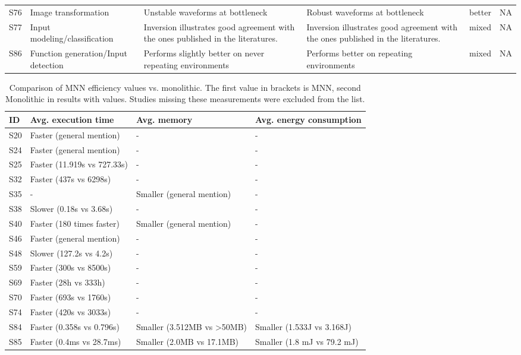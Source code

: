 \documentclass{article}
\begin{document}
\begin{table*}[]
\begin{tabularx}{\textwidth}{p{.2cm} p{4.75cm}  X X p{1.5cm} p{1.5cm} }
S76 	&	 Image transformation 			&	 Unstable waveforms at bottleneck 	&	 Robust waveforms at bottleneck 	&	better	&	 NA 	\\
S77 	&	 Input modeling/classification 			&	 Inversion illustrates good agreement with the ones published in the literatures. 	&	 Inversion illustrates good agreement with the ones published in the literatures. 	&	mixed	&	 NA 	\\
S86 	&	 Function generation/Input detection 			&	 Performs slightly better on never repeating environments 	&	 Performs better on repeating environments 	&	 mixed 	&	 NA 	\\

\hline
\end{tabularx}
\end{table*}


\begin{table*}[h]
\centering
\caption{Comparison of MNN efficiency values vs. monolithic. The first value in brackets is MNN, second Monolithic in results with values. Studies missing these measurements were excluded from the list.} \label{tab:energy}
\begin{tabularx}{\textwidth}{p{0.5cm} X X X   }\hline
ID&Avg. execution time&Avg. memory&Avg. energy consumption\\ \hline

S20 & Faster (general mention) & - & - \\
S24 & Faster (general mention) & - & - \\
S25 & Faster (11.919s vs 727.33s) & - & - \\
S32 & Faster (437s vs 6298s) & - & - \\
S35 & - & Smaller (general mention) & - \\
S38 & Slower (0.18s vs 3.68s) & - & - \\
S40 & Faster (180 times faster) & Smaller (general mention) & - \\
S46 & Faster (general mention) & - & - \\
S48 & Slower (127.2s vs 4.2s) & - & - \\
S59 & Faster (300s vs 8500s) & - & - \\
S69 & Faster (28h vs 333h)  & - & - \\
S70 & Faster (693s vs 1760s) & - & - \\
S74 & Faster (420s vs 3033s) & - & - \\
S84 & Faster (0.358s vs 0.796s) & Smaller (3.512MB vs \textgreater 50MB) & Smaller (1.533J vs 3.168J) \\
S85 & Faster (0.4ms vs 28.7ms)  & Smaller (2.0MB vs 17.1MB) & Smaller (1.8 mJ vs 79.2 mJ) \\
\hline
\end{tabularx}
\footnotesize
\raggedright 
\end{table*}
\end{document}
